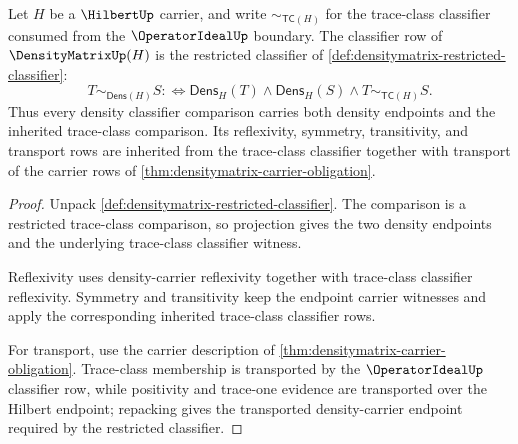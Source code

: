 \begin{theorem}
\label{thm:densitymatrix-restricted-classifier-obligation}
Let $H$ be a $\HilbertUp$ carrier, and write $\sim_{\mathsf{TC}(H)}$ for the trace-class classifier consumed from the $\OperatorIdealUp$ boundary. The classifier row of $\DensityMatrixUp(H)$ is the restricted classifier of \autoref{def:densitymatrix-restricted-classifier}:
$$
T\sim_{\mathsf{Dens}(H)}S
:\Longleftrightarrow
\mathsf{Dens}_H(T)\land\mathsf{Dens}_H(S)\land T\sim_{\mathsf{TC}(H)}S.
$$
Thus every density classifier comparison carries both density endpoints and the inherited trace-class comparison. Its reflexivity, symmetry, transitivity, and transport rows are inherited from the trace-class classifier together with transport of the carrier rows of \autoref{thm:densitymatrix-carrier-obligation}.
\end{theorem}
\begin{proof}
Unpack \autoref{def:densitymatrix-restricted-classifier}. The comparison is a restricted trace-class comparison, so projection gives the two density endpoints and the underlying trace-class classifier witness.

Reflexivity uses density-carrier reflexivity together with trace-class classifier reflexivity. Symmetry and transitivity keep the endpoint carrier witnesses and apply the corresponding inherited trace-class classifier rows.

For transport, use the carrier description of \autoref{thm:densitymatrix-carrier-obligation}. Trace-class membership is transported by the $\OperatorIdealUp$ classifier row, while positivity and trace-one evidence are transported over the Hilbert endpoint; repacking gives the transported density-carrier endpoint required by the restricted classifier.
\end{proof}

